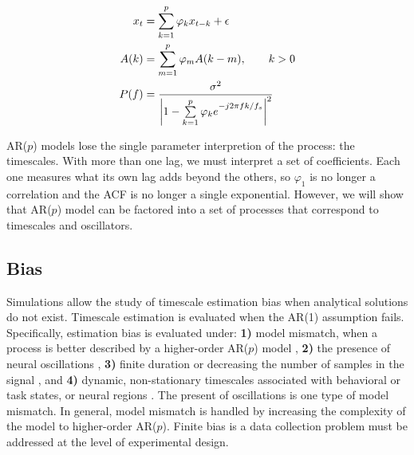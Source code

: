 \documentclass[pdflatex,sn-mathphys-num]{sn-jnl}
\begin{document}
\begin{align}
x_t &= \sum_{k=1}^p \varphi_k x_{t-k} + \epsilon \label{eq:arp} \\
A(k) &= \sum_{m=1}^p \varphi_m A(k-m), \qquad k > 0 \label{eq:arp_acf} \\
P(f) &= \frac{\sigma^{2}}{\left|1 - \sum\limits_{k=1}^p \varphi_{k} e\strut^{-j 2 \pi f k / f_s}\right|^{2}} \label{eq:arp_psd}
\end{align}

AR($p$) models lose the single parameter interpretion of the process: the timescales. With more than one lag, we must interpret a set of coefficients. Each one measures what its own lag adds beyond the others, so $\varphi_1$ is no longer a correlation and the ACF is no longer a single exponential. However, we will show that AR($p$) model can be factored into a set of processes that correspond to timescales and oscillators.

\subsection{Bias}\label{sec:bias}

Simulations allow the study of timescale estimation bias when analytical solutions do not exist. Timescale estimation is evaluated when the AR(1) assumption fails. Specifically, estimation bias is evaluated under: \textbf{1)} model mismatch, when a process is better described by a higher-order AR($p$) model \cite{broersen_finite_2000}, \textbf{2)} the presence of neural oscillations \cite{berger_uber_1929, buzsaki_neuronal_2004}, \textbf{3)} finite duration or decreasing the number of samples in the signal \cite{broersen_finite_2000, schwarz_estimating_1978, zeraati_flexible_2022}, and \textbf{4)} dynamic, non-stationary timescales associated with behavioral or task states, or neural regions \cite{gao_neuronal_2020, spitmaan_multiple_2020}. The present of oscillations is one type of model mismatch. In general, model mismatch is handled by increasing the complexity of the model to higher-order AR($p$). Finite bias is a data collection problem must be addressed at the level of experimental design.
\end{document}
